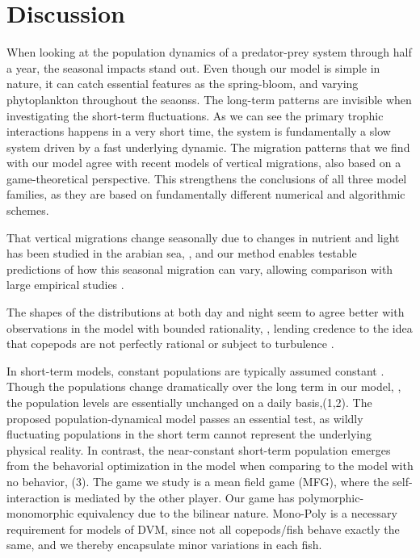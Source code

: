 \section{Discussion}
When looking at the population dynamics of a predator-prey system through half a year, the seasonal impacts stand out. Even though our model is simple in nature, it can catch essential features as the spring-bloom, and varying phytoplankton throughout the seaonss.  The long-term patterns are invisible when investigating the short-term fluctuations. As we can see the primary trophic interactions happens in a very short time, the system is fundamentally a slow system driven by a fast underlying dynamic. The migration patterns that we find with our model agree with  recent models of vertical migrations, also based on a game-theoretical perspective. This strengthens the conclusions of all three model families, as they are based on fundamentally different numerical and algorithmic schemes.





That vertical migrations change seasonally due to changes in nutrient and light has been studied in the arabian sea, \citep{wang2014seasonal}, and our method enables testable predictions of how this seasonal migration can vary, allowing comparison with large empirical studies \citep{klevjer2016large}.

The shapes of the distributions at both day and night seem to agree better with observations in the model with bounded rationality, \citep{hay1991zooplankton}, lending credence to the idea that copepods are not perfectly rational or subject to turbulence \citep{visser2001observations}.

In short-term models, constant populations are typically assumed constant \citep{...,...,...}. Though the populations change dramatically over the long term in our model, , the population levels are essentially unchanged on a daily basis,(1,2). The proposed population-dynamical model passes an essential test, as wildly fluctuating populations in the short term cannot represent the underlying physical reality. In contrast, the near-constant short-term population emerges from the behavorial optimization in the model when comparing to the model with no behavior, (3).  The game we study is a mean field game (MFG), where the self-interaction is mediated by the other player. Our game has polymorphic-monomorphic equivalency due to the bilinear nature. Mono-Poly is a necessary requirement for models of DVM, since not all copepods/fish behave exactly the same, and we thereby encapsulate minor variations in each fish.



